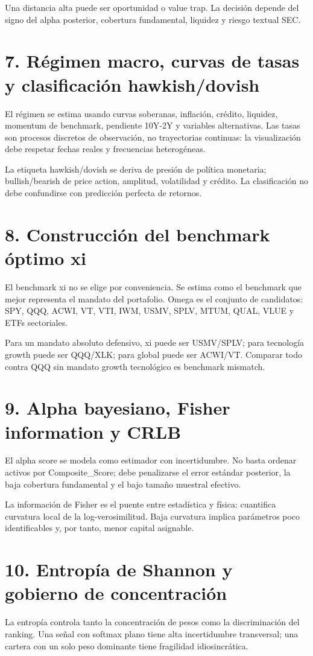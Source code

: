 \documentclass[11pt,letterpaper]{article}
\begin{document}
Una distancia alta puede ser oportunidad o value trap. La decisión depende del signo del alpha posterior, cobertura fundamental, liquidez y riesgo textual SEC.

\section{7. Régimen macro, curvas de tasas y clasificación hawkish/dovish}
El régimen se estima usando curvas soberanas, inflación, crédito, liquidez, momentum de benchmark, pendiente 10Y-2Y y variables alternativas. Las tasas son procesos discretos de observación, no trayectorias continuas: la visualización debe respetar fechas reales y frecuencias heterogéneas.

La etiqueta hawkish/dovish se deriva de presión de política monetaria; bullish/bearish de price action, amplitud, volatilidad y crédito. La clasificación no debe confundirse con predicción perfecta de retornos.

\section{8. Construcción del benchmark óptimo xi}
El benchmark xi no se elige por conveniencia. Se estima como el benchmark que mejor representa el mandato del portafolio. Omega es el conjunto de candidatos: SPY, QQQ, ACWI, VT, VTI, IWM, USMV, SPLV, MTUM, QUAL, VLUE y ETFs sectoriales.

Para un mandato absoluto defensivo, xi puede ser USMV/SPLV; para tecnología growth puede ser QQQ/XLK; para global puede ser ACWI/VT. Comparar todo contra QQQ sin mandato growth tecnológico es benchmark mismatch.

\section{9. Alpha bayesiano, Fisher information y CRLB}
El alpha score se modela como estimador con incertidumbre. No basta ordenar activos por Composite\_Score; debe penalizarse el error estándar posterior, la baja cobertura fundamental y el bajo tamaño muestral efectivo.

La información de Fisher es el puente entre estadística y física: cuantifica curvatura local de la log-verosimilitud. Baja curvatura implica parámetros poco identificables y, por tanto, menor capital asignable.

\section{10. Entropía de Shannon y gobierno de concentración}
La entropía controla tanto la concentración de pesos como la discriminación del ranking. Una señal con softmax plano tiene alta incertidumbre transversal; una cartera con un solo peso dominante tiene fragilidad idiosincrática.
\end{document}
